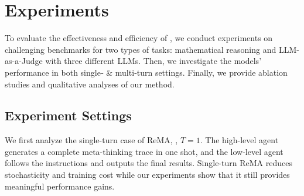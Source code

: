 
\section{Experiments} \label{sec:exp}

To evaluate the effectiveness and efficiency of \method, we conduct experiments on challenging benchmarks for two types of tasks: mathematical reasoning and LLM-as-a-Judge with three different LLMs. Then, we investigate the models' performance in both single‑ \& multi‑turn settings. Finally, we provide ablation studies and qualitative analyses of our method. 




\subsection{Experiment Settings} 
\label{sec:exp_settings}
We first analyze the single-turn case of ReMA, \ie, $T=1$. 
The high-level agent generates a complete meta-thinking trace in one shot, and the low-level agent follows the instructions and outputs the final results. 
Single-turn ReMA reduces stochasticity and training cost while our experiments show that it still provides meaningful performance gains.

